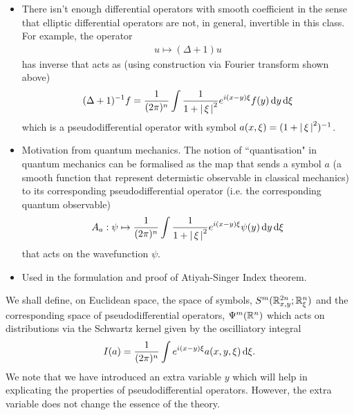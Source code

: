 \documentclass[12pt]{article}
\begin{document}
\begin{itemize}
    \item  There isn't enough differential operators with smooth coefficient in the sense that elliptic differential operators are not, in general, invertible in this class. For example, the operator
    \begin{align*}
    u \mapsto (\Delta + 1) u 
    \end{align*}
    has inverse that acts as (using construction via Fourier transform shown above)
    \begin{align*}
    (\Delta+ 1)^{-1} f = \frac{1}{(2\pi)^n} \int \frac{1}{1 + \abs{\xi}^2} e^{i(x -y) \xi} f(y)\d[y] \d[\xi]
    \end{align*}
    which is a pseudodifferential operator with symbol $a(x, \xi) = (1 + \abs{\xi}^2)^{-1}$. 
    
    \item Motivation from quantum mechanics. The notion of ``quantisation" in quantum mechanics can be formalised as the map that sends a symbol $a$ (a smooth function that represent determistic observable in classical mechanics) to its corresponding pseudodifferential operator (i.e. the corresponding quantum observable)
    \begin{align*}
    A_a : \psi \mapsto \frac{1}{(2\pi)^n} \int \frac{1}{1 + \abs{\xi}^2} e^{i(x -y) \xi} \psi(y)\d[y] \d[\xi]
    \end{align*}
    that acts on the wavefunction $\psi$. 
    
    \item Used in the formulation and proof of Atiyah-Singer Index theorem. 
\end{itemize}

We shall define, on Euclidean space, the space of symbols, $S^m(\R^{2n}_{x, y}; \R^n_{\xi})$ and the corresponding space of pseudodifferential operators, $\Psi^m(\R^n)$ which acts on distributions via the Schwartz kernel given by the oscilliatory integral 
\begin{align*}
I(a) = \frac{1}{(2\pi)^n} \int e^{i(x- y)\xi} a(x, y, \xi) \d[\xi]. 
\end{align*}
We note that we have introduced an extra variable $y$ which will help in explicating the properties of pseudodifferential operators. However, the extra variable does not change the essence of the theory. 
\end{document}
